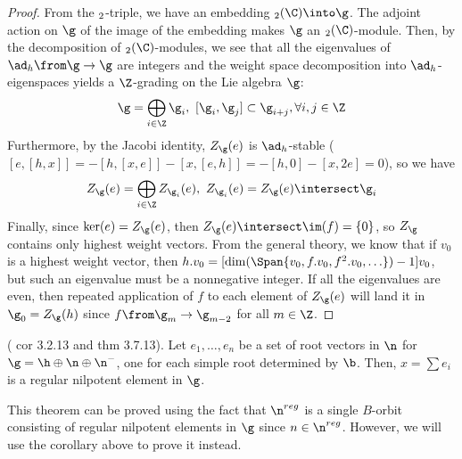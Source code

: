 \documentclass[springer-theory-notes.tex]{subfiles}
\begin{document}
\begin{proof}
  From the \(\sl_2\)-triple, we have an embedding \(\sl_2(\C) \into
  \g\). The adjoint action on \(\g\) of the image of the embedding
  makes \(\g\) an \(\sl_2(\C)\)-module. Then, by the decomposition of
  \(\sl_2(\C)\)-modules, we see that all the eigenvalues of \(\ad_h
  \from \g \to \g\) are integers and the weight space decomposition
  into \(\ad_h\)-eigenspaces yields a \(\Z\)-grading on the Lie
  algebra \(\g\): \[
    \g = \bigoplus_{i \in \Z} \g_i, \ [\g_i, \g_j] \subset \g_{i+j},
    \forall i, j \in \Z
  \]
  Furthermore, by the Jacobi identity, \(Z_\g(e)\) is
  \(\ad_h\)-stable (\([e,[h,x]] =
  -[h,[x,e]]-[x,[e,h]] = -[h,0]-[x,2e] = 0\)), so we have \[
    Z_\g(e) = \bigoplus_{i \in \Z} Z_{\g_i}(e), \ Z_{\g_i}(e) =
    Z_\g(e) \intersect \g_i
  \]
  Finally, since \(\ker(e) = Z_\g(e)\), then \(Z_\g(e) \intersect
  \im(f) = \{0\}\), so \(Z_\g\) contains only highest weight
  vectors. From the general theory, we know that if \(v_0\) is a
  highest weight vector, then \(h.v_0 = [\dim(\Span\{v_0, f.v_0,
  f^2.v_0, \ldots\})-1]v_0\), but such an eigenvalue must be a
  nonnegative integer. If all the eigenvalues are even, then repeated application
  of \(f\)
  to each element of \(Z_\g(e)\) will land it in \(\g_0 =
  Z_\g(h)\) since \(f \from \g_m \to \g_{m-2}\) for all \(m \in \Z\).
\end{proof}
\begin{thm}
  (\cite{cg} cor 3.2.13 and thm 3.7.13). Let \(e_1, \ldots, e_n\) be a
  set of root vectors in \(\n\) for \(\g = \h \oplus \n \oplus
  \n^-\), one for each simple root determined by \(\b\). Then, \(x =
  \sum e_i\) is a regular nilpotent element in \(\g\).
\end{thm}
\begin{rmk}
  This theorem can be proved using the fact that \(\n^{reg}\) is a
  single \(B\)-orbit consisting of regular nilpotent elements in
  \(\g\) since \(n \in \n^{reg}\). However, we will use the corollary
  above to prove it instead.
\end{rmk}
\end{document}
